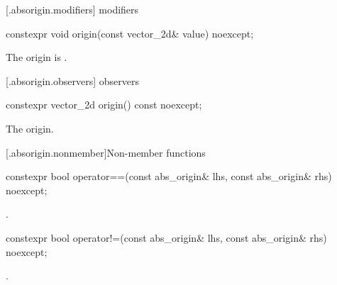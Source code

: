  [\iotwod.absorigin.modifiers]{ modifiers}

%
\begin{itemdecl}
constexpr void origin(const vector_2d& value) noexcept;
\end{itemdecl}
\begin{itemdescr}
\pnum
\effects
The origin is .
\end{itemdescr}

 [\iotwod.absorigin.observers]{ observers}

%
\begin{itemdecl}
constexpr vector_2d origin() const noexcept;
\end{itemdecl}
\begin{itemdescr}
\pnum
\returns
The origin.
\end{itemdescr}

 [\iotwod.absorigin.nonmember]{Non-member functions}

%
\begin{itemdecl}
constexpr bool operator==(const abs_origin& lhs, const abs_origin& rhs) 
  noexcept;
\end{itemdecl}
\begin{itemdescr}
\pnum
\returns
{}.
\end{itemdescr}

%
\begin{itemdecl}
constexpr bool operator!=(const abs_origin& lhs, const abs_origin& rhs) 
  noexcept;
\end{itemdecl}
\begin{itemdescr}
\pnum
\returns
{}.
\end{itemdescr}
